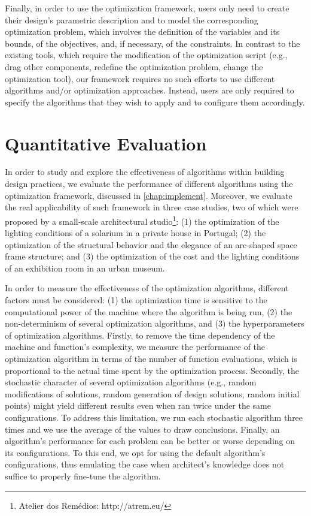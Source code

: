 Finally, in order to use the optimization framework, users only need to create their design's parametric description and to model the corresponding optimization problem, which involves the definition of the variables and its bounds, of the objectives, and, if necessary, of the constraints. In contrast to the existing tools, which require the modification of the optimization script (e.g., drag other components, redefine the optimization problem, change the optimization tool), our framework requires no such efforts to use different algorithms and/or optimization approaches. Instead, users are only required to specify the algorithms that they wish to apply and to configure them accordingly.

\section{Quantitative Evaluation}
\label{sec:quantitative}

In order to study and explore the effectiveness of algorithms within building design practices, we evaluate the performance of different algorithms using the optimization framework, discussed in \cref{chap:implement}. Moreover, we evaluate the real applicability of such framework in three case studies, two of which were proposed by a small-scale architectural studio\footnote{Atelier dos Remédios: http://atrem.eu/}: (1) the optimization of the lighting conditions of a solarium in a private house in Portugal; (2) the optimization of the structural behavior and the elegance of an arc-shaped space frame structure; and (3) the optimization of the cost and the lighting conditions of an exhibition room in an urban museum.   

In order to measure the effectiveness of the optimization algorithms, different factors must be considered: (1) the optimization time is sensitive to the computational power of the machine where the algorithm is being run, (2) the non-determinism of several optimization algorithms, and (3) the hyperparameters of optimization algorithms. Firstly, to remove the time dependency of the machine and function's complexity, we measure the performance of the optimization algorithm in terms of the number of function evaluations, which is proportional to the actual time spent by the optimization process. Secondly, the stochastic character of several optimization algorithms (e.g., random modifications of solutions, random generation of design solutions, random initial points) might yield different results even when ran twice under the same configurations. To address this limitation, we run each stochastic algorithm three times and we use the average of the values to draw conclusions. Finally, an algorithm's performance for each problem can be better or worse depending on its configurations. To this end, we opt for using the default algorithm's configurations, thus emulating the case when architect's knowledge does not suffice to properly fine-tune the algorithm. 
 
